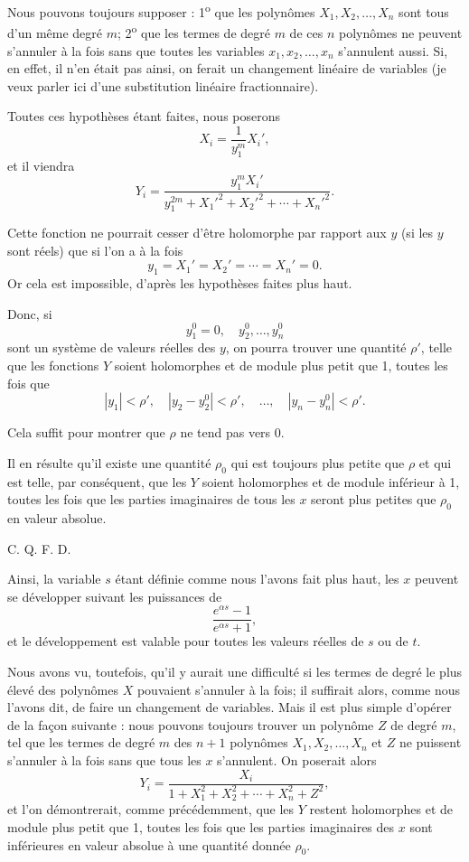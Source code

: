 \documentclass[11pt]{article}
\begin{document}
Nous pouvons toujours supposer : 1\textsuperscript{o} que les polynômes $X_1,X_2,\ldots,X_n$ sont tous d’un même degré $m$; 2\textsuperscript{o} que les termes de degré $m$ de ces $n$ polynômes ne peuvent s’annuler à la fois sans que toutes les variables $x_1,x_2,\ldots,x_n$ s’annulent aussi. Si, en effet, il n’en était pas ainsi, on ferait un changement linéaire de variables (je veux parler ici d’une substitution linéaire fractionnaire).

Toutes ces hypothèses étant faites, nous poserons
\[
X_i=\frac{1}{y_1^m}X_i',
\]
et il viendra
\[
Y_i=\frac{y_1^m X_i'}{y_1^{2m}+X_1'^2+X_2'^2+\cdots+X_n'^2}.
\]

Cette fonction ne pourrait cesser d’être holomorphe par rapport aux $y$ (si les $y$ sont réels) que si l’on a à la fois
\[
y_1=X_1'=X_2'=\cdots=X_n'=0.
\]
Or cela est impossible, d’après les hypothèses faites plus haut.

Donc, si
\[
y_1^0=0,
\quad y_2^0,\ldots,y_n^0
\]
sont un système de valeurs réelles des $y$, on pourra trouver une quantité $\rho'$, telle que les fonctions $Y$ soient holomorphes et de module plus petit que 1, toutes les fois que
\[
|y_1|<\rho',\quad |y_2-y_2^0|<\rho',\quad \ldots,
\quad |y_n-y_n^0|<\rho'.
\]

Cela suffit pour montrer que $\rho$ ne tend pas vers 0.

Il en résulte qu’il existe une quantité $\rho_0$ qui est toujours plus petite que $\rho$ et qui est telle, par conséquent, que les $Y$ soient holomorphes et de module inférieur à 1, toutes les fois que les parties imaginaires de tous les $x$ seront plus petites que $\rho_0$ en valeur absolue. \begin{flushright}C. Q. F. D.\end{flushright}

Ainsi, la variable $s$ étant définie comme nous l’avons fait plus haut, les $x$ peuvent se développer suivant les puissances de
\[
\frac{e^{\alpha s}-1}{e^{\alpha s}+1},
\]
et le développement est valable pour toutes les valeurs réelles de $s$ ou de $t$.

Nous avons vu, toutefois, qu’il y aurait une difficulté si les termes de degré le plus élevé des polynômes $X$ pouvaient s’annuler à la fois; il suffirait alors, comme nous l’avons dit, de faire un changement de variables. Mais il est plus simple d’opérer de la façon suivante : nous pouvons toujours trouver un polynôme $Z$ de degré $m$, tel que les termes de degré $m$ des $n+1$ polynômes $X_1,X_2,\ldots,X_n$ et $Z$ ne puissent s’annuler à la fois sans que tous les $x$ s’annulent. On poserait alors
\[
Y_i=\frac{X_i}{1+X_1^2+X_2^2+\cdots+X_n^2+Z^2},
\]
et l’on démontrerait, comme précédemment, que les $Y$ restent holomorphes et de module plus petit que 1, toutes les fois que les parties imaginaires des $x$ sont inférieures en valeur absolue à une quantité donnée $\rho_0$.
\end{document}
